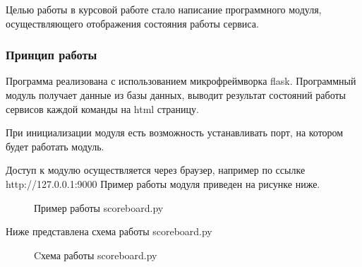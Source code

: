 Целью работы в курсовой работе стало написание программного модуля, осуществляющего отображения состояния работы сервиса.

\subsubsection{Принцип работы}

Программа реализована с использованием микрофреймворка flask. Программный модуль получает данные из базы данных, выводит результат состояний работы сервисов каждой команды на html страницу.

При инициализации модуля есть возможность устанавливать порт, на котором будет работать модуль.

Доступ к модулю осуществляется через браузер, например по ссылке http://127.0.0.1:9000  
Пример работы модуля приведен на рисунке ниже.
\begin{figure}[h!]
\caption{Пример работы scoreboard.py}
\end{figure}

Ниже представлена схема работы scoreboard.py

\begin{figure}[h!]
\caption{Cхема работы scoreboard.py}
\end{figure}

\clearpage